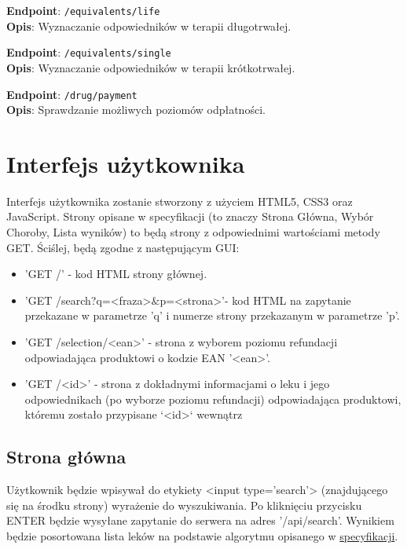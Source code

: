 \documentclass{article}
\begin{document}
\textbf{Endpoint}: \verb|/equivalents/life| \\
\textbf{Opis}: Wyznaczanie odpowiedników w terapii długotrwałej.

\textbf{Endpoint}: \verb|/equivalents/single| \\
\textbf{Opis}: Wyznaczanie odpowiedników w terapii krótkotrwałej.

\textbf{Endpoint}: \verb|/drug/payment| \\
\textbf{Opis}: Sprawdzanie możliwych poziomów odpłatności.

\fi
\section{Interfejs użytkownika}

Interfejs użytkownika zostanie stworzony z użyciem HTML5, CSS3 oraz JavaScript. Strony opisane w specyfikacji (to znaczy Strona Główna, Wybór Choroby, Lista wyników) to będą strony z odpowiednimi wartościami metody GET. Ściślej, będą zgodne z następującym GUI:
\begin{itemize}
    \item 'GET /' - kod HTML strony głównej.
    \item 'GET /search?q=<fraza>$\&$p=<strona>'- kod HTML na zapytanie przekazane w parametrze 'q' i numerze strony przekazanym w parametrze 'p'.
    \item 'GET /selection/<ean>' - strona z wyborem poziomu refundacji odpowiadająca produktowi o kodzie EAN '<ean>'.
    \item 'GET /<id>' - strona z dokładnymi informacjami o leku i jego odpowiednikach (po wyborze poziomu refundacji) odpowiadająca produktowi, któremu zostało przypisane `<id>` wewnątrz
\end{itemize}


\subsection{Strona główna}
Użytkownik będzie wpisywał do etykiety <input type='search'> (znajdującego się na środku strony) wyrażenie do wyszukiwania.
Po kliknięciu przycisku ENTER będzie wysyłane zapytanie do serwera na adres '/api/search'. Wynikiem będzie posortowana lista leków na podstawie algorytmu opisanego w 
\href{https://github.com/KamilloP/IO/blob/main/algos_io.png}{specyfikacji}.
\iffalse
\begin{center}
    \texttt{[image: site/algos\_io.png]}
\end{center}
\fi
\end{document}
